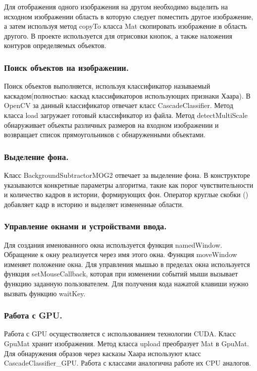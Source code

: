Для отображения одного изображения на другом необходимо выделить на исходном изображении область в которую следует поместить другое изображение, а затем используя метод copyTo класса Mat скопировать изображение в область другого. В проекте используется для отрисовки кнопок, а также наложения контуров определяемых объектов.

\subsubsection{Поиск объектов на изображении. }
\label{sec:program_design:opencv_elements:ocv_objdetect}
Поиск объектов выполняется, используя классификатор называемый каскадом(полностью: каскад классификаторов использующих признаки Хаара).  В OpenCV за данный классификатор отвечает класс CascadeClassifier.
Метод класса load загружает готовый классификатор из файла. Метод detectMultiScale обнаруживает объекты различных размеров на входном изображении и возвращает список прямоугольников с обнаруженными объектами.

\subsubsection{Выделение фона. }
\label{sec:program_design:opencv_elements:back_subtraction}
Класс BackgroundSubtractorMOG2 отвечает за выделение фона. В конструкторе указываются конкретные параметры алгоритма, такие как порог чувствительности и количество кадров в истории, формирующих фон.
Оператор круглые скобки () добавляет кадр в историю и выделяет измененные области.

\subsubsection{Управление окнами и устройствами ввода. }
\label{sec:program_design:opencv_elements:ocv_io}
Для создания именованного окна используется функция namedWindow. Обращение к окну реализуется через имя этого окна. Функция moveWindow изменяет положение окна.
Для управления мышью в пределах окна используется функция setMouseCallback, которая при изменении событий мыши вызывает функцию заданную пользователем.
Для получения кода нажатой клавиши нужно вызвать функцию waitKey.

\subsubsection{Работа с GPU. }
\label{sec:program_design:opencv_elements:GPU}
Работа с GPU осуществоляется с использованием технологии CUDA. Класс GpuMat хранит изображения. Метод класса upload преобразует Mat в GpuMat. Для обнаружения образов через касказы Хаара используют класс CascadeClassifier\_GPU.
Работа с классами аналогична работе их CPU аналогов. 


